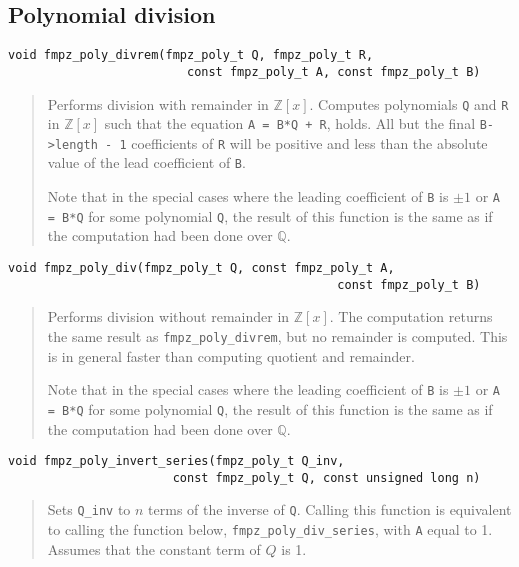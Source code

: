 \documentclass[a4paper,10pt]{article}
\newcommand{\Z}{\mathbb{Z}}
\newcommand{\Q}{\mathbb{Q}}
\newcommand{\code}{\lstinline}
\begin{document}
\subsection{Polynomial division}

\begin{lstlisting}
void fmpz_poly_divrem(fmpz_poly_t Q, fmpz_poly_t R, 
                         const fmpz_poly_t A, const fmpz_poly_t B) 
\end{lstlisting}
\begin{quote}
Performs division with remainder in $\Z[x]$. Computes polynomials \code{Q} and \code{R} in $\Z[x]$ such that the equation \code{A = B*Q + R}, holds. All but the final \code{B->length - 1} coefficients of \code{R} will be positive and less than the absolute value of the lead coefficient of \code{B}.

Note that in the special cases where the leading coefficient of \code{B} is $\pm 1$ or \code{A = B*Q} for some polynomial \code{Q}, the result of this function is the same as if the computation had been done over $\Q$.
\end{quote}

\begin{lstlisting}
void fmpz_poly_div(fmpz_poly_t Q, const fmpz_poly_t A, 
                                              const fmpz_poly_t B) 
\end{lstlisting}
\begin{quote}
Performs division without remainder in $\Z[x]$. The computation returns the same result as \code{fmpz_poly_divrem}, but no remainder is computed. This is in general faster than computing quotient and remainder. 

Note that in the special cases where the leading coefficient of \code{B} is $\pm 1$ or \code{A = B*Q} for some polynomial \code{Q}, the result of this function is the same as if the computation had been done over $\Q$. 
\end{quote}

\begin{lstlisting}
void fmpz_poly_invert_series(fmpz_poly_t Q_inv, 
                       const fmpz_poly_t Q, const unsigned long n)  
\end{lstlisting}
\begin{quote}
Sets \code{Q_inv} to $n$ terms of the inverse of \code{Q}. Calling this function is equivalent to calling the function below, \code{fmpz_poly_div_series}, with \code{A} equal to 1. Assumes that the constant term of $Q$ is 1. 
\end{quote}
\end{document}
